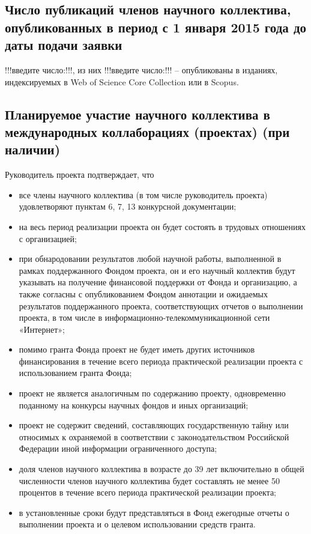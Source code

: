 \documentclass[12pt]{article}  %
\theoremstyle{remark}
\begin{document}
\subsection{Число публикаций членов научного коллектива, опубликованных в период с 1 января 2015 года до даты подачи заявки}

!!!введите число:!!!, из них !!!введите число:!!! – опубликованы в изданиях, индексируемых в Web of Science Core Collection или в Scopus.

\subsection{Планируемое участие научного коллектива в международных коллаборациях (проектах) (при наличии)}

\vline
Руководитель проекта подтверждает, что
\begin{itemize}
\item все члены научного коллектива (в том числе руководитель проекта) удовлетворяют пунктам 6, 7, 13 конкурсной документации;
\item на весь период реализации проекта он будет состоять в трудовых отношениях с организацией;
\item при обнародовании результатов любой научной работы, выполненной в рамках поддержанного Фондом проекта, он и его научный коллектив будут указывать на получение финансовой поддержки от Фонда и организацию, а также согласны с опубликованием Фондом аннотации и ожидаемых результатов поддержанного проекта, соответствующих отчетов о выполнении проекта, в том числе в информационно-телекоммуникационной сети «Интернет»;
\item помимо гранта Фонда проект не будет иметь других источников финансирования в течение всего периода практической реализации проекта с использованием гранта Фонда;
\item проект не является аналогичным по содержанию проекту, одновременно поданному на конкурсы научных фондов и иных организаций;
\item проект не содержит сведений, составляющих государственную тайну или относимых к охраняемой в соответствии с законодательством Российской Федерации иной информации ограниченного доступа;
\item доля членов научного коллектива в возрасте до 39 лет включительно в общей численности членов научного коллектива будет составлять не менее 50 процентов в течение всего периода практической реализации проекта;
\item в установленные сроки будут представляться в Фонд ежегодные отчеты о выполнении проекта и о целевом использовании средств гранта.
\end{itemize}
\end{document}
